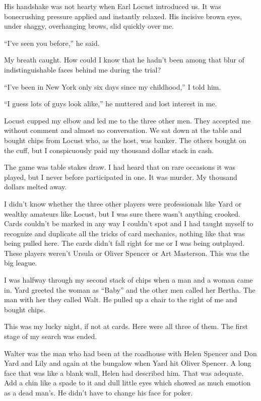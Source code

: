 {His handshake was not hearty when Earl Locust introduced us. It was bonecrushing pressure applied and instantly relaxed. His incisive brown eyes, under shaggy, overhanging brows, slid quickly over me.

“I’ve seen you before,” he said.

My breath caught. How could I know that he hadn’t been among that blur of indistinguishable faces behind me during the trial?

“I’ve been in New York only six days since my childhood,” I told him.

“I guess lots of guys look alike,” he muttered and lost interest in me.

Locust cupped my elbow and led me to the three other men. They accepted me without comment and almost no conversation. We sat down at the table and bought chips from Locust who, as the host, was banker. The others bought on the cuff, but I conspicuously paid my thousand dollar stack in cash.

The game was table stakes draw. I had heard that on rare occasions it was played, but I never before participated in one. It was murder. My thousand dollars melted away.

I didn’t know whether the three other players were professionals like Yard or wealthy amateurs like Locust, but I was sure there wasn’t anything crooked. Cards couldn’t be marked in any way I couldn’t spot and I had taught myself to recognize and duplicate all the tricks of card mechanics, nothing like that was being pulled here. The cards didn’t fall right for me or I was being outplayed. These players weren’t Ursula or Oliver Spencer or Art Masterson. This was the big league.

I was halfway through my second stack of chips when a man and a woman came in. Yard greeted the woman as “Baby” and the other men called her Bertha. The man with her they called Walt. He pulled up a chair to the right of me and bought chips.

This was my lucky night, if not at cards. Here were all three of them. The first stage of my search was ended.

Walter was the man who had been at the roadhouse with Helen Spencer and Don Yard and Lily and again at the bungalow when Yard hit Oliver Spencer. A long face that was like a blank wall, Helen had described him. That was adequate. Add a chin like a spade to it and dull little eyes which showed as much emotion as a dead man’s. He didn’t have to change his face for poker.

}
